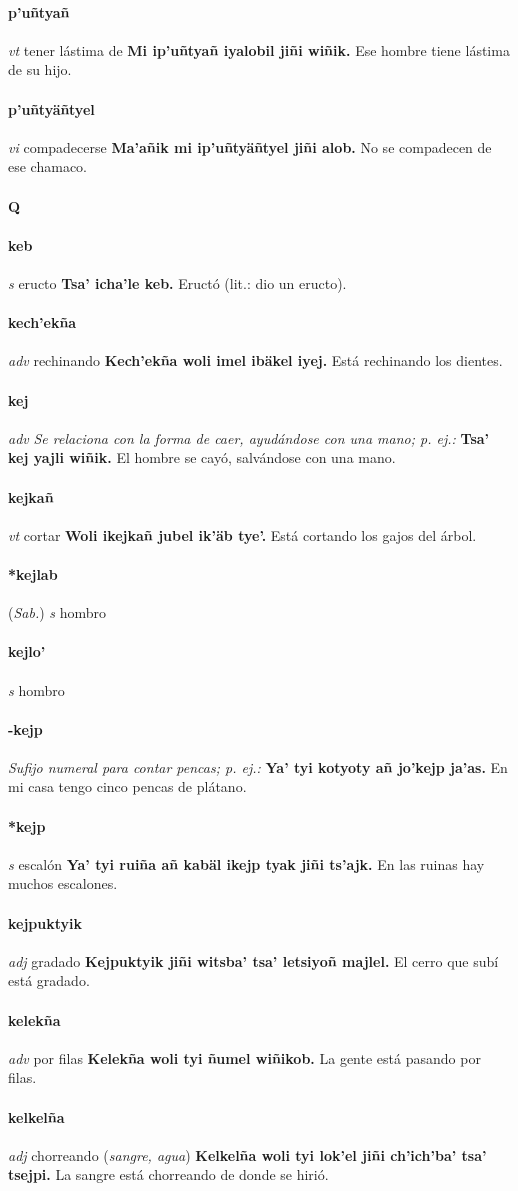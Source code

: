 \documentclass{scrbook}
\newcommand{\entry}[1]{\paragraph{#1}}
\newcommand{\alphaletter}[1]{\addsec{#1}}
\newcommand{\nontranslationdef}[1]{\textit{#1}}
\newcommand{\partofspeech}[1]{\textit{#1}}
\newcommand{\spanishtranslation}[1]{#1}
\newcommand{\clarification}[1]{(\textit{#1})}
\newcommand{\cholexample}[1]{\textbf{#1}}
\newcommand{\exampletranslation}[1]{#1}
\newcommand{\relevantdialect}[1]{(\textit{#1})}
\begin{document}
\begin{multicols}{2}
\entry{p'uñtyañ}
\partofspeech{vt}
\spanishtranslation{tener lástima de}
\cholexample{Mi ip'uñtyañ iyalobil jiñi wiñik.}
\exampletranslation{Ese hombre tiene lástima de su hijo.}

\entry{p'uñtyäñtyel}
\partofspeech{vi}
\spanishtranslation{compadecerse}
\cholexample{Ma'añik mi ip'uñtyäñtyel jiñi alob.}
\exampletranslation{No se compadecen de ese chamaco.}

\entry{Q}
\alphaletter{Q}

\entry{keb}
\partofspeech{s}
\spanishtranslation{eructo}
\cholexample{Tsa' icha'le keb.}
\exampletranslation{Eructó (lit.: dio un eructo).}

\entry{kech'ekña}
\partofspeech{adv}
\spanishtranslation{rechinando}
\cholexample{Kech'ekña woli imel ibäkel iyej.}
\exampletranslation{Está rechinando los dientes.}

\entry{kej}
\partofspeech{adv}
\nontranslationdef{Se relaciona con la forma de caer, ayudándose con una mano; p. ej.:}
\cholexample{Tsa' kej yajli wiñik.}
\exampletranslation{El hombre se cayó, salvándose con una mano.}

\entry{kejkañ}
\partofspeech{vt}
\spanishtranslation{cortar}
\cholexample{Woli ikejkañ jubel ik'äb tye'.}
\exampletranslation{Está cortando los gajos del árbol.}

\entry{*kejlab}
\relevantdialect{Sab.}
\partofspeech{s}
\spanishtranslation{hombro}

\entry{kejlo'}
\partofspeech{s}
\spanishtranslation{hombro}

\entry{-kejp}
\nontranslationdef{Sufijo numeral para contar pencas; p. ej.:}
\cholexample{Ya' tyi kotyoty añ jo'kejp ja'as.}
\exampletranslation{En mi casa tengo cinco pencas de plátano.}

\entry{*kejp}
\partofspeech{s}
\spanishtranslation{escalón}
\cholexample{Ya' tyi ruiña añ kabäl ikejp tyak jiñi ts'ajk.}
\exampletranslation{En las ruinas hay muchos escalones.}

\entry{kejpuktyik}
\partofspeech{adj}
\spanishtranslation{gradado}
\cholexample{Kejpuktyik jiñi witsba' tsa' letsiyoñ majlel.}
\exampletranslation{El cerro que subí está gradado.}

\entry{kelekña}
\partofspeech{adv}
\spanishtranslation{por filas}
\cholexample{Kelekña woli tyi ñumel wiñikob.}
\exampletranslation{La gente está pasando por filas.}

\entry{kelkelña}
\partofspeech{adj}
\spanishtranslation{chorreando}
\clarification{sangre, agua}
\cholexample{Kelkelña woli tyi lok'el jiñi ch'ich'ba' tsa' tsejpi.}
\exampletranslation{La sangre está chorreando de donde se hirió.}


\end{multicols}
\end{document}
